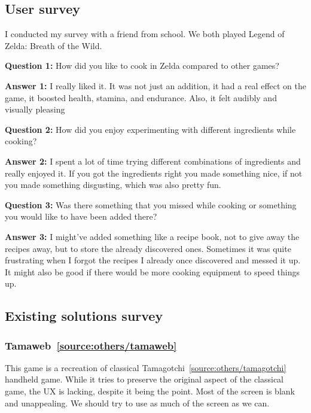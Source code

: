 \documentclass[11pt]{article}
\begin{document}
\subsection{User survey}
I conducted my survey with a friend from school. We both played Legend of Zelda: Breath of the Wild.

    \textbf{Question 1:} How did you like to cook in Zelda compared to other games?

    \textbf{Answer 1:} I really liked it. It was not just an addition, it had a real effect on the game, it boosted health, stamina, and endurance. Also, it felt audibly and visually pleasing

    \textbf{Question 2:} How did you enjoy experimenting with different ingredients while cooking?

    \textbf{Answer 2:} I spent a lot of time trying different combinations of ingredients and really enjoyed it. If you got the ingredients right you made something nice, if not you made something disgusting, which was also pretty fun.

    \textbf{Question 3:} Was there something that you missed while cooking or something you would like to have been added there?
    
    \textbf{Answer 3:} I might've added something like a recipe book, not to give away the recipes away, but to store the already discovered ones. Sometimes it was quite frustrating when I forgot the recipes I already once discovered and messed it up. It might also be good if there would be more cooking equipment to speed things up.

\subsection{Existing solutions survey}

\subsubsection{Tamaweb~\ref{source:others/tamaweb}}
This game is a recreation of classical Tamagotchi~\ref{source:others/tamagotchi} handheld game. While it tries to preserve the original aspect of the classical game, the UX is lacking, despite it being the point. Most of the screen is blank and unappealing. We should try to use as much of the screen as we can.
\end{document}

